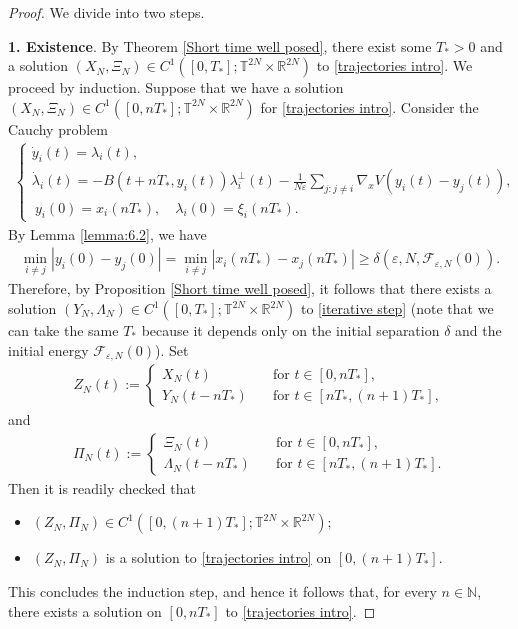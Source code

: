 \documentclass[10pt,a4paper]{amsart}
\begin{document}
\begin{proof}  We divide into two steps.

\smallskip
\textbf{1. Existence}.
By 
Theorem \ref{Short time well posed}, there exist some $T_{\ast}>0$ and a solution $(X_{N},\Xi_{N})\in C^{1}([0,T_{\ast}];\mathbb{T}^{2N}\times \mathbb{R}^{2N})$ to \eqref{trajectories intro}. We proceed by induction. Suppose that we have a solution $(X_{N},\Xi_{N})\in C^{1}([0,nT_{\ast}];\mathbb{T}^{2N}\times \mathbb{R}^{2N})$ for \eqref{trajectories intro}. Consider the  Cauchy problem 
\begin{align}
\begin{cases}
\dot y_{i}(t)=\lambda_{i}(t),\\[1mm]
\dot \lambda_{i}(t)=-B(t+nT_{\ast},y_{i}(t))\lambda_{i}^{\perp}(t)-\frac{1}{N\varepsilon}\underset{j:j\neq i}{\sum}\nabla_{x}V(y_{i}(t)-y_{j}(t)),\\
\ y_{i}(0)=x_{i}(nT_{\ast}),\quad \lambda_{i}(0)=\xi_{i}(nT_{\ast}). 
\end{cases} \label{iterative step}   
\end{align}
By Lemma \ref{lemma:6.2}, we have
\begin{align*}
\min_{i\neq j}\left\vert y_{i}(0)-y_{j}(0)\right\vert=\min_{i\neq j}\left\vert x_{i}(nT_{\ast})-x_{j}(nT_{\ast})\right\vert\geq \delta(\varepsilon,N,\mathcal{F}_{\varepsilon,N}(0)).      
\end{align*}
Therefore, by Proposition \ref{Short time well posed}, 
it follows that there exists a solution 
$(Y_{N},\Lambda_{N})\in C^{1}([0,T_{\ast}];\mathbb{T}^{2N}\times \mathbb{R}^{2N})$ 
to \eqref{iterative step} 
(note that we can take the same $T_{\ast}$ because it depends only on the initial separation $\delta$ and the initial energy $\mathcal{F}_{\varepsilon,N}(0)$). Set 
\begin{align*}
Z_{N}(t):=\begin{cases}
X_{N}(t) &\quad \mbox{for $t\in [0,nT_{\ast}]$},\\
Y_{N}(t-nT_{\ast})&\quad \mbox{for $t\in [nT_{\ast},(n+1)T_{\ast}]$},
\end{cases}
\end{align*}
and 
\begin{align*}
\Pi_{N}(t):=\begin{cases}
\Xi_{N}(t)&\quad\mbox{for $t\in [0,nT_{\ast}]$},\\
\Lambda_{N}(t-nT_{\ast}) &\quad\mbox{for $t\in [nT_{\ast},(n+1)T_{\ast}]$}. 
\end{cases}    
\end{align*}
Then it is readily checked that 
\begin{itemize}
\item[{\rm(a)}] $(Z_{N},\Pi_{N})\in C^{1}([0,(n+1)T_{\ast}];\mathbb{T}^{2N}\times \mathbb{R}^{2N});$
\smallskip
\item[{\rm(b)}] $(Z_{N},\Pi_{N})$ is a solution to \eqref{trajectories intro} on $[0,(n+1)T_{\ast}]$.
\end{itemize}
This concludes the induction step, and hence it follows that, for every $n\in \mathbb{N}$, 
there exists a solution on $[0,nT_{\ast}]$ to \eqref{trajectories intro}. 


\end{proof}
\end{document}
